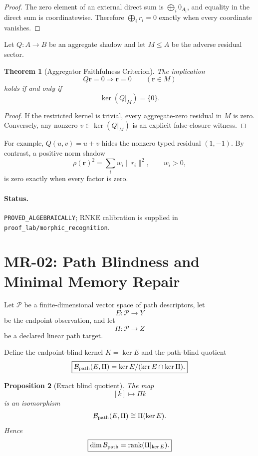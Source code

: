 \documentclass[11pt]{article}
\newtheorem{theorem}{Theorem}[section]
\newtheorem{proposition}[theorem]{Proposition}
\newcommand{\status}[1]{\texttt{#1}}
\begin{document}
\begin{proof}
The zero element of an external direct sum is \(\bigoplus_i0_{A_i}\), and equality in the direct sum is coordinatewise. Therefore \(\bigoplus_i r_i=0\) exactly when every coordinate vanishes.
\end{proof}

Let \(Q:A\to B\) be an aggregate shadow and let \(M\le A\) be the adverse residual sector.

\begin{theorem}[Aggregator Faithfulness Criterion]
The implication
\[
Q\mathbf r=0\Longrightarrow\mathbf r=0
\qquad(\mathbf r\in M)
\]
holds if and only if
\[
\boxed{\ker(Q|_M)=\{0\}.}
\]
\end{theorem}

\begin{proof}
If the restricted kernel is trivial, every aggregate-zero residual in \(M\) is zero. Conversely, any nonzero \(v\in\ker(Q|_M)\) is an explicit false-closure witness.
\end{proof}

For example, \(Q(u,v)=u+v\) hides the nonzero typed residual \((1,-1)\). By contrast, a positive norm shadow
\[
\rho(\mathbf r)^2=\sum_iw_i\|r_i\|^2,
\qquad w_i>0,
\]
is zero exactly when every factor is zero.

\paragraph{Status.}
\status{PROVED\_ALGEBRAICALLY}; RNKE calibration is supplied in \texttt{proof\_lab/morphic\_recognition}.

\section{MR-02: Path Blindness and Minimal Memory Repair}

Let \(\mathcal P\) be a finite-dimensional vector space of path descriptors, let
\[
E:\mathcal P\to Y
\]
be the endpoint observation, and let
\[
\Pi:\mathcal P\to Z
\]
be a declared linear path target.

Define the endpoint-blind kernel \(K=\ker E\) and the path-blind quotient
\[
\boxed{
\mathcal B_{\rm path}(E,\Pi)
=
\ker E/(\ker E\cap\ker\Pi).
}
\]

\begin{proposition}[Exact blind quotient]
The map
\[
[k]\mapsto\Pi k
\]
is an isomorphism
\[
\mathcal B_{\rm path}(E,\Pi)
\cong
\Pi(\ker E).
\]
Hence
\[
\boxed{
\dim\mathcal B_{\rm path}
=
\operatorname{rank}(\Pi|_{\ker E}).
}
\]
\end{proposition}
\end{document}
